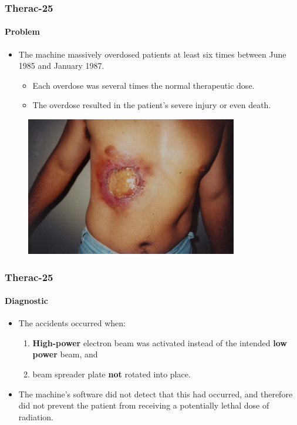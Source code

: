 \begin{frame}
\frametitle{Therac-25}
\framesubtitle{Problem}

\begin{itemize}
	\item The machine massively overdosed patients at least six times
	between June 1985 and January 1987.
	\begin{itemize}
		\item Each overdose was several times the normal therapeutic dose.

		\item The overdose resulted in the patient's severe injury or even
		death.
	\end{itemize}
\end{itemize}

\begin{figure}
	\centering
	\includegraphics{aux/examples/therac-25/radiation-burn}
\end{figure}

\end{frame}


\begin{frame}
\frametitle{Therac-25}
\framesubtitle{Diagnostic}

\begin{itemize}
	\item The accidents occurred when:
	\begin{enumerate}
		\item \textbf{High-power} electron beam was activated instead of the
		intended \textbf{low power} beam, and
		\item beam spreader plate \textbf{not} rotated into place.
	\end{enumerate}

	\item The machine's software did not detect that this had occurred,
	and therefore did not prevent the patient from receiving a
	potentially lethal dose of radiation.
\end{itemize}
\end{frame}


